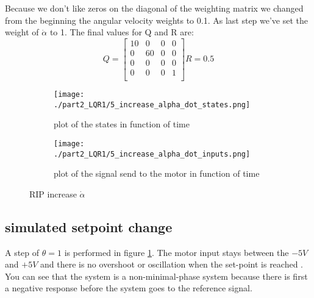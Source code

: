 Because we don't like zeros on the diagonal of the weighting matrix we changed from the beginning the angular velocity weights to 0.1. As last step we've set the weight of $\dot{\alpha}$ to 1. The final values for Q and R are:
$$
Q=\begin{bmatrix}
10 & 0 & 0 & 0 \\
0 & 60 & 0 & 0 \\
0 & 0 & 0 & 0 \\
0 & 0 & 0 & 1 \\
\end{bmatrix}
R=0.5
$$

\begin{figure}[H]
	\centering
	\begin{subfigure}[b]{0.45\textwidth}
		\texttt{[image: ./part2\_LQR1/5\_increase\_alpha\_dot\_states.png]}
		\caption{plot of the states in function of time}
	\end{subfigure}
	\begin{subfigure}[b]{0.45\textwidth}
		\texttt{[image: ./part2\_LQR1/5\_increase\_alpha\_dot\_inputs.png]}
		\caption{plot of the signal send to the motor in function of time}
	\end{subfigure}
	\caption{RIP increase $\dot{\alpha}$}
	\label{fig:last_sim_3}
\end{figure}




\subsection{simulated setpoint change}

A step of $\theta = 1$ is performed in figure \ref{fig:last_sim_3}. The motor input stays between the $-5V$ and $+5V$ and there is no overshoot or oscillation when the set-point is reached . You can see that the system is a non-minimal-phase system because there is first a negative response before the system goes to the reference signal.
